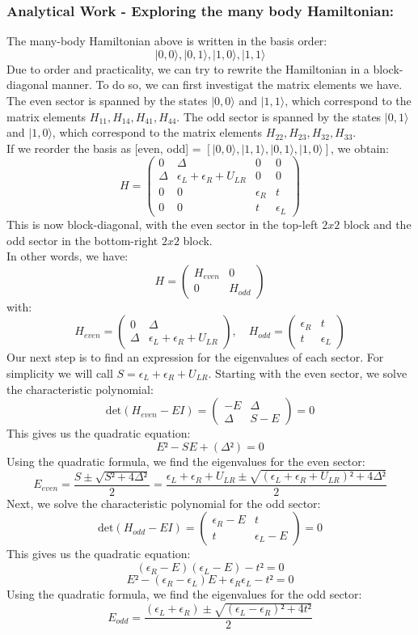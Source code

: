 \documentclass[11pt, letterpaper, titlepage]{article}
\begin{document}
\subsubsection{Analytical Work - Exploring the many body Hamiltonian:} 
The many-body Hamiltonian above is written in the basis order:
$$ |0,0⟩, |0,1⟩, |1,0⟩, |1,1⟩ $$
Due to order and practicality, we can try to rewrite the Hamiltonian in a block-diagonal manner. To do so, we can first investigat the matrix elements we have. The even sector is spanned by the states $|0,0⟩$ and $|1,1⟩$, which correspond to the matrix elements $H_{11}, H_{14}, H_{41}, H_{44}$. The odd sector is spanned by the states $|0,1⟩$ and $|1,0⟩$, which correspond to the matrix elements $H_{22}, H_{23}, H_{32}, H_{33}$.\\
If we reorder the basis as [even, odd] = $[|0,0⟩, |1,1⟩, |0,1⟩, |1,0⟩]$, we obtain:
$$
H = \begin{pmatrix}
0 & Δ & 0 & 0 \\
Δ & ϵ_L + ϵ_R + U_{LR} & 0 & 0 \\
0 & 0 & ϵ_R & t \\
0 & 0 & t & ϵ_L
\end{pmatrix}
$$
This is now block-diagonal, with the even sector in the top-left $2x2$ block and the odd sector in the bottom-right $2x2$ block.\\
In other words, we have:
$$
H = \begin{pmatrix}
H_{even} & 0 \\
0 & H_{odd}
\end{pmatrix}
$$
with:
$$
H_{even} = \begin{pmatrix}
0 & Δ \\
Δ & ϵ_L + ϵ_R + U_{LR}
\end{pmatrix}, \quad
H_{odd} = \begin{pmatrix}
ϵ_R & t \\
t & ϵ_L
\end{pmatrix}
$$
Our next step is to find an expression for the eigenvalues of each sector. For simplicity we will call $S = ϵ_L + ϵ_R + U_{LR}$. Starting with the even sector, we solve the characteristic polynomial:
$$
\text{det}(H_{even} - EI) = \begin{pmatrix}
    -E & Δ \\
    Δ & S - E
\end{pmatrix} =0
$$
This gives us the quadratic equation:
$$
E² - SE + (Δ²) = 0
$$
Using the quadratic formula, we find the eigenvalues for the even sector:
$$E_{even} = \frac{S ± \sqrt{S² + 4Δ²}}{2} = \frac{ϵ_L + ϵ_R + U_{LR} ± \sqrt{(ϵ_L + ϵ_R + U_{LR})² + 4Δ²}}{2}$$
Next, we solve the characteristic polynomial for the odd sector:
$$
\text{det}(H_{odd} - EI) = \begin{pmatrix}
    ϵ_R - E & t \\
    t & ϵ_L - E
\end{pmatrix} =0
$$
This gives us the quadratic equation:
$$(ϵ_R-E)(ϵ_L - E)  - t² = 0$$
$$E² -(ϵ_R-ϵ_L)E + ϵ_R ϵ_L - t² = 0$$
Using the quadratic formula, we find the eigenvalues for the odd sector:
$$E_{odd} = \frac{(ϵ_L + ϵ_R) ± \sqrt{(ϵ_L - ϵ_R)² + 4t²}}{2}$$
\end{document}
